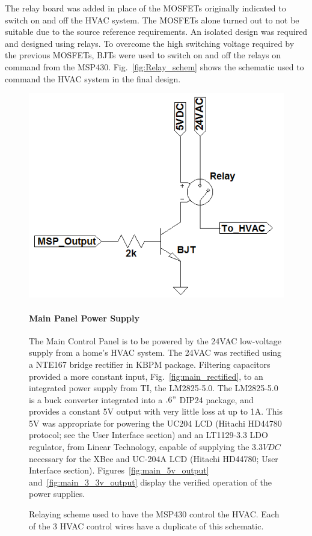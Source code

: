 The relay board was added in place of the MOSFETs originally indicated to switch on and off the HVAC system.  The MOSFETs alone turned out to not be suitable due to the source reference requirements.  An isolated design was required and designed using relays.  To overcome the high switching voltage required by the previous MOSFETs, BJTs were used to switch on and off the relays on command from the MSP430.  Fig.~\ref{fig:Relay_schem} shows the schematic used to command the HVAC system in the final design.

\begin{figure}
\centering
\includegraphics[width=.99\textwidth]{Relay_schem.png}
\caption{Relaying scheme used to have the MSP430 control the HVAC. Each of the 3 HVAC control wires have a duplicate of this schematic.}

\paragraph{Main Panel Power Supply}
The Main Control Panel is to be powered by the 24VAC low-voltage supply from a home's HVAC system. The 24VAC was rectified using a NTE167 bridge rectifier in KBPM package.  Filtering capacitors provided a more constant input, Fig.~\ref{fig:main_rectified}, to an integrated power supply from TI, the LM2825-5.0.  The LM2825-5.0 is a buck converter integrated into a $.6"$ DIP24 package, and provides a constant 5V output with very little loss at up to 1A.  This 5V was appropriate for powering the UC204 LCD (Hitachi HD44780 protocol; see the User Interface section) and an LT1129-3.3 LDO regulator, from Linear Technology, capable of supplying the $3.3VDC$ necessary for the XBee and UC-204A LCD (Hitachi HD44780; User Interface section). Figures~\ref{fig:main_5v_output} and~\ref{fig:main_3_3v_output} display the verified operation of the power supplies.


\end{figure}

